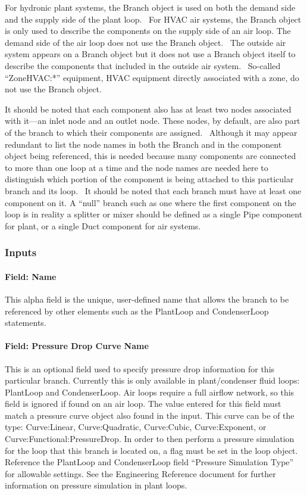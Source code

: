For hydronic plant systems, the Branch object is used on both the demand side and the supply side of the plant loop.~ For HVAC air systems, the Branch object is only used to describe the components on the supply side of an air loop. The demand side of the air loop does not use the Branch object.~ The outside air system appears on a Branch object but it does not use a Branch object itself to describe the components that included in the outside air system.~ So-called ``ZoneHVAC:*'' equipment, HVAC equipment directly associated with a zone, do not use the Branch object.

It should be noted that each component also has at least two nodes associated with it---an inlet node and an outlet node. These nodes, by default, are also part of the branch to which their components are assigned.~ Although it may appear redundant to list the node names in both the Branch and in the component object being referenced, this is needed because many components are connected to more than one loop at a time and the node names are needed here to distinguish which portion of the component is being attached to this particular branch and its loop.~ It should be noted that each branch must have at least one component on it. A ``null'' branch such as one where the first component on the loop is in reality a splitter or mixer should be defined as a single Pipe component for plant, or a single Duct component for air systems.

\subsubsection{Inputs}\label{inputs-2-023}

\paragraph{Field: Name}\label{field-name-2-022}

This alpha field is the unique, user-defined name that allows the branch to be referenced by other elements such as the PlantLoop and CondenserLoop statements.

\paragraph{Field: Pressure Drop Curve Name}\label{field-pressure-drop-curve-name}

This is an optional field used to specify pressure drop information for this particular branch. Currently this is only available in plant/condenser fluid loops: PlantLoop and CondenserLoop. Air loops require a full airflow network, so this field is ignored if found on an air loop. The value entered for this field must match a pressure curve object also found in the input. This curve can be of the type: Curve:Linear, Curve:Quadratic, Curve:Cubic, Curve:Exponent, or Curve:Functional:PressureDrop. In order to then perform a pressure simulation for the loop that this branch is located on, a flag must be set in the loop object. Reference the PlantLoop and CondenserLoop field ``Pressure Simulation Type'' for allowable settings. See the Engineering Reference document for further information on pressure simulation in plant loops.

